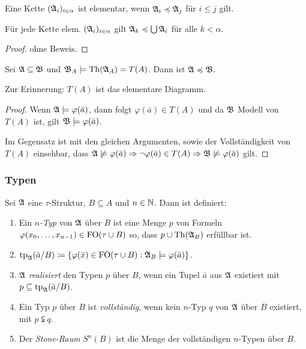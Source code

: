 \begin{definition}
	Eine Kette $(\mathfrak{A}_i)_{i\in \alpha}$ ist elementar, wenn $\mathfrak{A}_i\preccurlyeq\mathfrak{A}_j$ für $i\leq j$ gilt.
\end{definition}

\begin{satz}
	Für jede Kette elem. $(\mathfrak{A}_i)_{i\in \alpha}$ gilt $\mathfrak{A}_k\preccurlyeq\bigcup\mathfrak{A}_i$ für alle $k<\alpha$.
\end{satz}
\begin{proof}
	ohne Beweis.
\end{proof}

\begin{lemma}
	Sei $\mathfrak{A}\subseteq\mathfrak{B}$ und $\mathfrak{B}_A\models \operatorname{Th}(\mathfrak{A}_A)=T(A)$. Dann ist $\mathfrak{A}\preccurlyeq\mathfrak{B}$.
\end{lemma}
Zur Erinnerung: $T(A)$ ist das elementare Diagramm.
\begin{proof}
	Wenn $\mathfrak{A}\models\varphi(\bar{a})$, dann folgt $\varphi(\bar{a})\in T(A)$ und da $\mathfrak{B}$ Modell von $T(A)$ ist, gilt $\mathfrak{B}\models\varphi(\bar{a})$.
	
	Im Gegensatz ist mit den gleichen Argumenten, sowie der Vollständigkeit von $T(A)$ einsehbar, dass $\mathfrak{A}\not\models\varphi(\bar{a}) \Rightarrow \neg\varphi(\bar{a})\in T(A) \Rightarrow \mathfrak{B}\not\models\varphi(\bar{a})$ gilt.
\end{proof}


\subsubsection*{Typen}

\begin{definition}
	Sei $\mathfrak{A}$ eine $\tau$-Struktur, $B\subseteq A$ und $n\in \mathbb{N}$. Dann ist definiert:
	\begin{enumerate}
		\item Ein \textit{$n$-Typ} von $\mathfrak{A}$ über $B$ ist eine Menge $p$ von Formeln $\varphi(x_0,\dots,x_{n-1})\in \operatorname{FO}(\tau\cup B)$ so, dass $p\cup \operatorname{Th}(\mathfrak{A}_B)$ erfüllbar ist.
		\item $\operatorname{tp}_{\mathfrak{A}}(\bar{a}/B)\coloneqq \{\varphi(\bar{x}) \in \operatorname{FO}(\tau\cup B) : \mathfrak{A}_B\models\varphi(\bar{a})\}$.
		\item $\mathfrak{A}$ \textit{realisiert} den Typen $p$ über $B$, wenn ein Tupel $\bar{a}$ aus $\mathfrak{A}$ existiert mit $p\subseteq \operatorname{tp}_{\mathfrak{A}}(\bar{a}/B)$.
		\item Ein Typ $p$ über $B$ ist \textit{vollständig}, wenn kein $n$-Typ $q$ von $\mathfrak{A}$ über $B$ existiert, mit $p\subsetneqq q$.
		\item Der \textit{Stone-Raum} $S^n(B)$ ist die Menge der vollständigen $n$-Typen über $B$.
	\end{enumerate}
\end{definition}

